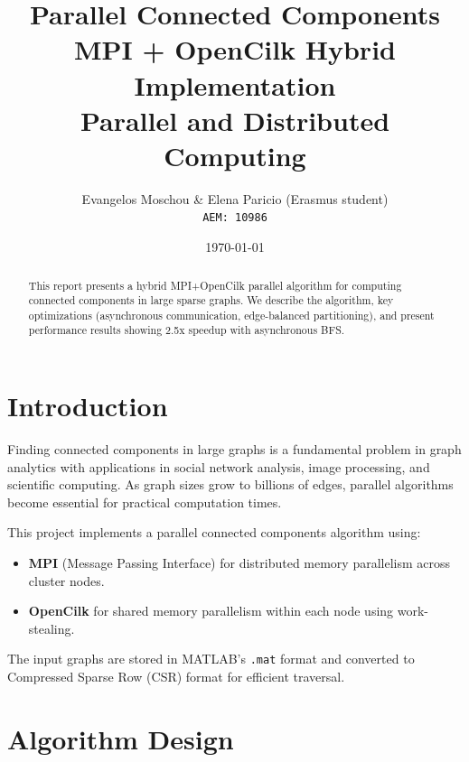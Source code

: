 \documentclass[11pt,a4paper]{article}
\title{
    \textbf{Parallel Connected Components}\\[0.5em]
    \large MPI + OpenCilk Hybrid Implementation\\[1em]
    \normalsize Parallel and Distributed Computing
}
\author{
    Evangelos Moschou \& Elena Paricio (Erasmus student)\\
    \texttt{AEM: 10986}
}
\date{\today}
\begin{document}
\maketitle

\begin{abstract}
This report presents a hybrid MPI+OpenCilk parallel algorithm for computing connected components in large sparse graphs. We describe the algorithm, key optimizations (asynchronous communication, edge-balanced partitioning), and present performance results showing 2.5x speedup with asynchronous BFS.
\end{abstract}

\section{Introduction}

Finding connected components in large graphs is a fundamental problem in graph analytics with applications in social network analysis, image processing, and scientific computing. As graph sizes grow to billions of edges, parallel algorithms become essential for practical computation times.

This project implements a parallel connected components algorithm using:
\begin{itemize}
    \item \textbf{MPI} (Message Passing Interface) for distributed memory parallelism across cluster nodes.
    \item \textbf{OpenCilk} for shared memory parallelism within each node using work-stealing.
\end{itemize}

The input graphs are stored in MATLAB's \texttt{.mat} format and converted to Compressed Sparse Row (CSR) format for efficient traversal.

\section{Algorithm Design}
\end{document}
